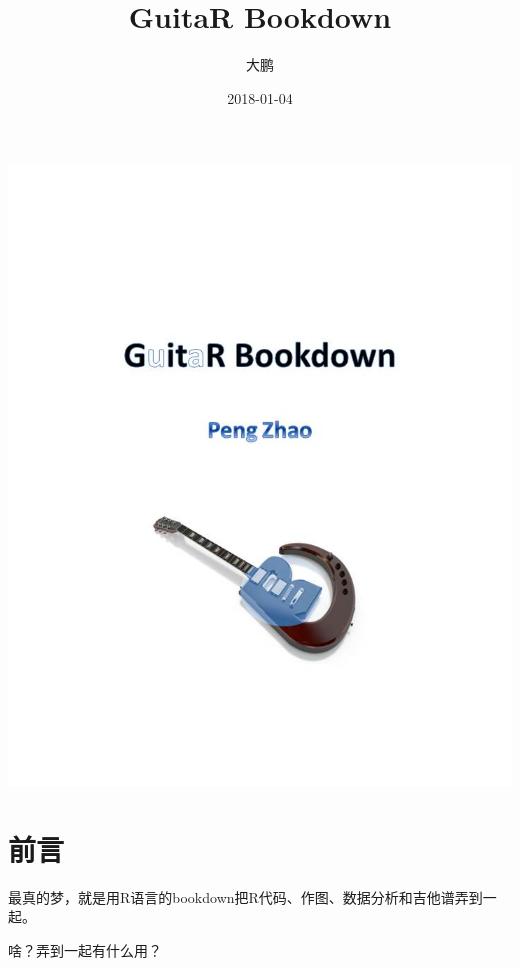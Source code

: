 \documentclass[openany]{ctexbook}
\title{GuitaR Bookdown}
\author{大鹏}
\date{2018-01-04}
\newcommand\mychords{
\def\chordsize{1.6mm}   %
\font\fingerfont=cmr5  %
\font\namefont=cmr10    %
\font\fretposfont=cmr7  %
\def\dampsymbol{{\tiny$\scriptstyle\times$}} %
}
\theoremstyle{definition}
\theoremstyle{definition}
\theoremstyle{definition}
\theoremstyle{remark}
\begin{document}
%
\begin{titlepage}
    \centering
    \includegraphics[width=\textwidth]{images/cover.jpg}
\end{titlepage}


\thispagestyle{empty}

\setlength{\abovedisplayskip}{-5pt}
\setlength{\abovedisplayshortskip}{-5pt}


{
\setcounter{tocdepth}{1}
\tableofcontents
}
\chapter*{前言}\label{front}

最真的梦，就是用R语言的bookdown把R代码、作图、数据分析和吉他谱弄到一起。

啥？弄到一起有什么用？
\end{document}
